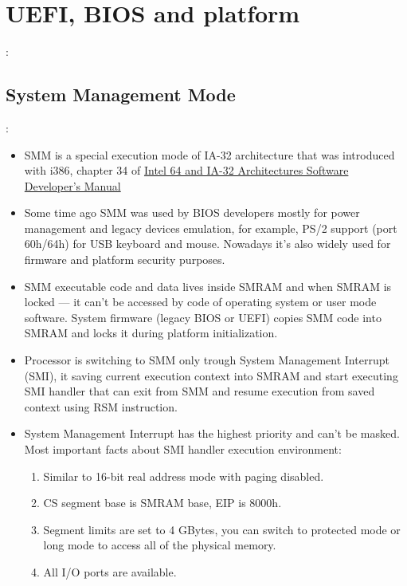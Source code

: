 \chapter{UEFI, BIOS and platform}
\begin{note}[Abbreviations]:\\
	
\end{note}

\section{System Management Mode}
\begin{note}:
\begin{itemize}
	\item SMM is a special execution mode of IA-32 architecture that was introduced with i386, chapter 34 of \href{http://www.intel.com/content/www/us/en/processors/architectures-software-developer-manuals.html}{Intel 64 and IA-32 Architectures Software Developer’s Manual}
	\item Some time ago SMM was used by BIOS developers mostly for power management and legacy devices emulation, for example, PS/2 support (port 60h/64h) for USB keyboard and mouse. Nowadays it's also widely used for firmware and platform security purposes.
	\item SMM executable code and data lives inside SMRAM and when SMRAM is locked — it can't be accessed by code of operating system or user mode software. System firmware (legacy BIOS or UEFI) copies SMM code into SMRAM and locks it during platform initialization.
	\item Processor is switching to SMM only trough System Management Interrupt (SMI), it saving current execution context into SMRAM and start executing SMI handler that can exit from SMM and resume execution from saved context using RSM instruction.
	\item System Management Interrupt has the highest priority and can’t be masked. Most important facts about SMI handler execution environment:
	\begin{enumerate}
		\item Similar to 16-bit real address mode with paging disabled.
		\item CS segment base is SMRAM base, EIP is 8000h.
		\item Segment limits are set to 4 GBytes, you can switch to protected mode or long mode to access all of the physical memory.
		\item All I/O ports are available.

\end{enumerate}
\end{itemize}
\end{note}
